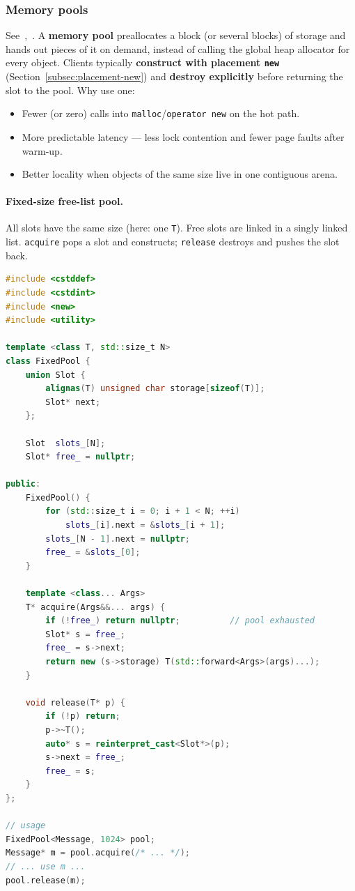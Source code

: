 \subsubsection{Memory pools}
\label{subsec:memory-pools}
See~\cite{cppreference-unsynchronized-pool-resource},~\cite{wiki-object-pool}.
\newline
A \textbf{memory pool} preallocates a block (or several blocks) of storage and 
hands out pieces of it on demand, instead of calling the global heap allocator 
for every object. Clients typically \textbf{construct with placement \texttt{new}} 
(Section~\ref{subsec:placement-new}) and \textbf{destroy explicitly} before 
returning the slot to the pool.
\newline
Why use one:
\begin{itemize}
    \item Fewer (or zero) calls into \texttt{malloc}/\texttt{operator new} on the hot path.
    \item More predictable latency --- less lock contention and fewer page faults after warm-up.
    \item Better locality when objects of the same size live in one contiguous arena.
\end{itemize}

\paragraph*{Fixed-size free-list pool.}
All slots have the same size (here: one \texttt{T}). Free slots are linked in a 
singly linked list. \texttt{acquire} pops a slot and constructs; \texttt{release} 
destroys and pushes the slot back.

\begin{lstlisting}[language=C++]
#include <cstddef>
#include <cstdint>
#include <new>
#include <utility>

template <class T, std::size_t N>
class FixedPool {
    union Slot {
        alignas(T) unsigned char storage[sizeof(T)];
        Slot* next;
    };

    Slot  slots_[N];
    Slot* free_ = nullptr;

public:
    FixedPool() {
        for (std::size_t i = 0; i + 1 < N; ++i)
            slots_[i].next = &slots_[i + 1];
        slots_[N - 1].next = nullptr;
        free_ = &slots_[0];
    }

    template <class... Args>
    T* acquire(Args&&... args) {
        if (!free_) return nullptr;          // pool exhausted
        Slot* s = free_;
        free_ = s->next;
        return new (s->storage) T(std::forward<Args>(args)...);
    }

    void release(T* p) {
        if (!p) return;
        p->~T();
        auto* s = reinterpret_cast<Slot*>(p);
        s->next = free_;
        free_ = s;
    }
};

// usage
FixedPool<Message, 1024> pool;
Message* m = pool.acquire(/* ... */);
// ... use m ...
pool.release(m);
\end{lstlisting}

